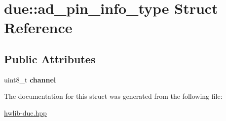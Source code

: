 \hypertarget{structdue_1_1ad__pin__info__type}{}\section{due\+:\+:ad\+\_\+pin\+\_\+info\+\_\+type Struct Reference}
\label{structdue_1_1ad__pin__info__type}
\subsection*{Public Attributes}
\begin{DoxyCompactItemize}
\item 
uint8\+\_\+t {\bfseries channel}\hypertarget{structdue_1_1ad__pin__info__type_ae23ba2025e81198f877ccaaa5927a368}{}\label{structdue_1_1ad__pin__info__type_ae23ba2025e81198f877ccaaa5927a368}

\end{DoxyCompactItemize}


The documentation for this struct was generated from the following file\+:\begin{DoxyCompactItemize}
\item 
\hyperlink{hwlib-due_8hpp}{hwlib-\/due.\+hpp}\end{DoxyCompactItemize}
